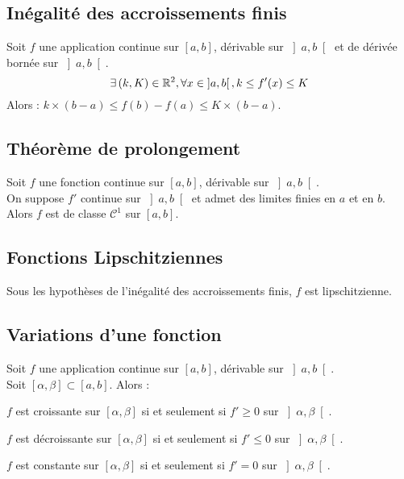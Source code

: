 \documentclass[12pt,twoside,a4paper]{article}
\begin{document}
		\subsection{In\'egalit\'e des accroissements finis}
			\begin{prop}
				Soit $f$ une application continue sur $\left[a,b\right]$, d\'erivable sur $\left]a,b\right[$ et de d\'eriv\'ee born\'ee sur $\left]a,b\right[$.
				$$
					\exists\left(k,K\right)\in\mathbb{R}^2,\forall x\in\left]a,b\right[,k\leq f'(x)\leq K
				$$
				Alors : $k\times(b-a)\leq f(b)-f(a)\leq K\times(b-a)$.
			\end{prop}
		\subsection{Th\'eor\`eme de prolongement}
			\begin{prop}
				Soit $f$ une fonction continue sur $\left[a,b\right]$, d\'erivable sur $\left]a,b\right[$. \\
				On suppose $f'$ continue sur $\left]a,b\right[$ et admet des limites finies en $a$ et en $b$. \\
				Alors $f$ est de classe $\mathcal{C}^1$ sur $\left[a,b\right]$.
			\end{prop}
		\subsection{Fonctions Lipschitziennes}
			Sous les hypoth\`eses de l'in\'egalit\'e des accroissements finis, $f$ est lipschitzienne.
		\subsection{Variations d'une fonction}
			\begin{prop}
				Soit $f$ une application continue sur $\left[a,b\right]$, d\'erivable sur $\left]a,b\right[$. \\
				Soit $\left[\alpha,\beta\right]\subset\left[a,b\right]$. Alors :
				\begin{liste}
					\item $f$ est croissante sur $\left[\alpha,\beta\right]$ si et seulement si $f'\geq 0$ sur $\left]\alpha,\beta\right[$.
					\item $f$ est d\'ecroissante sur $\left[\alpha,\beta\right]$ si et seulement si $f'\leq 0$ sur $\left]\alpha,\beta\right[$.
					\item $f$ est constante sur $\left[\alpha,\beta\right]$ si et seulement si $f'=0$ sur $\left]\alpha,\beta\right[$.
				\end{liste}
			\end{prop}
\end{document}
